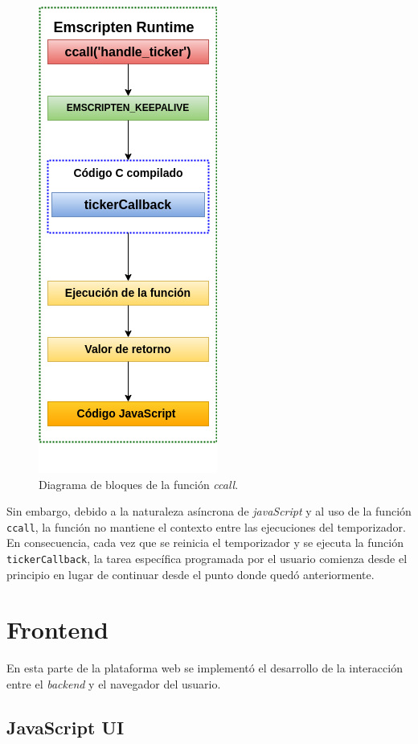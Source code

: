 \begin{figure}[ht]
	\centering
	\includegraphics[scale=.49]{./Figures/ccall.png}
	\caption{Diagrama de bloques de la función \textit{ccall}.}
	\label{fig:ccall}
\end{figure}

Sin embargo, debido a la naturaleza asíncrona de \textit{javaScript} y al uso de la función \texttt{ccall}, la función no mantiene el contexto entre las ejecuciones del temporizador. En consecuencia, cada vez que se reinicia el temporizador y se ejecuta la función  \texttt{tickerCallback}, la tarea específica programada por el usuario comienza desde el principio en lugar de continuar desde el punto donde quedó anteriormente. 


\section{Frontend}
En esta parte de la plataforma web se implementó el desarrollo de la interacción entre el \textit{backend} y el navegador del usuario.


\subsection{JavaScript UI}

